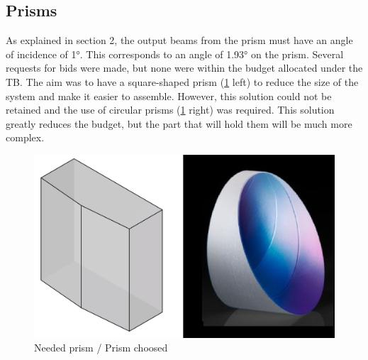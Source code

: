 \subsection{Prisms}
As explained in section 2, the output beams from the prism must have an angle of incidence of 1°. 
This corresponds to an angle of 1.93° on the prism. \newline
Several requests for bids were made, but none were within the budget allocated under the TB. The aim was to have a square-shaped 
prism (\ref{fig:Prism_square} left) to reduce the size of the system and make it easier to assemble. However, this solution could not be retained and the 
use of circular prisms (\ref{fig:Prism_square} right) was required. This solution greatly reduces the budget, but the part that will hold them will be much more complex.
\begin{figure}[H]
    \centering
    \includegraphics[scale=0.5]{assets/figures/Mechanical Design/prisme_voulu.png}
    \caption{Needed prism / Prism choosed}
    \label{fig:Prism_square}
\end{figure}
